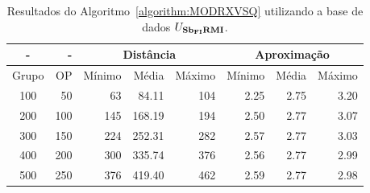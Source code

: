 \begin{table}[!htb]
  \caption{Resultados do Algoritmo~\ref{algorithm:MODRXVSQ} utilizando a base de dados $U_{\textbf{Sb\textsubscript{FI}RMI}}{}$.}
  \label{table:OBVONNLP}
  \centering
  \begin{tabular}{|c|r|r|r|r|r|r|r|}
    \hline
      -      &  -   & \multicolumn{3}{c|}{Distância}             & \multicolumn{3}{c|}{Aproximação}           \\ \hline
    Grupo    & OP   & Mínimo       & Média        & Máximo       & Mínimo       & Média        & Máximo       \\ \hline  
    100      & 50   & 63           &  84.11       & 104          & 2.25         & 2.75         & 3.20         \\ \hline
    200      & 100  & 145          & 168.19       & 194          & 2.50         & 2.77         & 3.07         \\ \hline
    300      & 150  & 224          & 252.31       & 282          & 2.57         & 2.77         & 3.03         \\ \hline
    400      & 200  & 300          & 335.74       & 376          & 2.56         & 2.77         & 2.99         \\ \hline
    500      & 250  & 376          & 419.40       & 462          & 2.59         & 2.77         & 2.98         \\ \hline    
  \end{tabular}
\end{table}